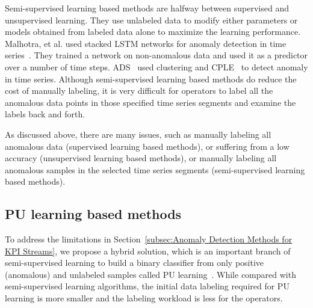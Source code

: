 Semi-supervised learning based methods are halfway between supervised and unsupervised learning. They use unlabeled data to modify either parameters or models obtained from labeled data alone to maximize the learning performance. Malhotra, et al. used stacked LSTM networks for anomaly detection in time series~\cite{Malhotra2015LongST}. They trained a network on non-anomalous data and used it as a predictor over a number of time steps. ADS~\cite{ADSarticle} used clustering and CPLE~\cite{loog2016contrastive} to detect anomaly in time series. Although semi-supervised learning based methods do reduce the cost of manually labeling, it is very difficult for operators to label all the anomalous data points in those specified time series segments and examine the labels back and forth.

As discussed above, there are many issues, such as manually labeling all anomalous data (supervised learning based methods), or suffering from a low accuracy (unsupervised learning based methods), or manually labeling all anomalous samples in the selected time series segments (semi-supervised learning based methods).

\subsection{PU learning based methods}
\label{subsec:PU learning based methods}
To address the limitations in Section~\ref{subsec:Anomaly Detection Methods for KPI Streams}, we propose a hybrid solution, which is an important branch of semi-supervised learning to build a binary classifier from only positive (anomalous) and unlabeled samples called PU learning~\cite{PUlearning2017}. While compared with semi-supervised learning algorithms, the initial data labeling required for PU learning is more smaller and the labeling workload is less for the operators.

